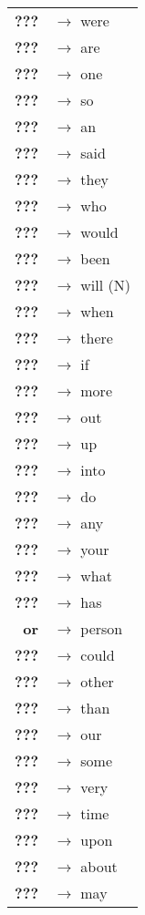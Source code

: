\begin{tabular}{rl}
\textbf{???} & $\rightarrow$ were \\
\textbf{???} & $\rightarrow$ are \\
\textbf{???} & $\rightarrow$ one \\
\textbf{???} & $\rightarrow$ so \\
\textbf{???} & $\rightarrow$ an \\
\textbf{???} & $\rightarrow$ said \\
\textbf{???} & $\rightarrow$ they \\
\textbf{???} & $\rightarrow$ who \\
\textbf{???} & $\rightarrow$ would \\
\textbf{???} & $\rightarrow$ been \\
\textbf{???} & $\rightarrow$ will (N) \\
\textbf{???} & $\rightarrow$ when \\
\textbf{???} & $\rightarrow$ there \\
\textbf{???} & $\rightarrow$ if \\
\textbf{???} & $\rightarrow$ more \\
\textbf{???} & $\rightarrow$ out \\
\textbf{???} & $\rightarrow$ up \\
\textbf{???} & $\rightarrow$ into \\
\textbf{???} & $\rightarrow$ do \\
\textbf{???} & $\rightarrow$ any \\
\textbf{???} & $\rightarrow$ your \\
\textbf{???} & $\rightarrow$ what \\
\textbf{???} & $\rightarrow$ has \\
\textbf{or} & $\rightarrow$ person \\
\textbf{???} & $\rightarrow$ could \\
\textbf{???} & $\rightarrow$ other \\
\textbf{???} & $\rightarrow$ than \\
\textbf{???} & $\rightarrow$ our \\
\textbf{???} & $\rightarrow$ some \\
\textbf{???} & $\rightarrow$ very \\
\textbf{???} & $\rightarrow$ time \\
\textbf{???} & $\rightarrow$ upon \\
\textbf{???} & $\rightarrow$ about \\
\textbf{???} & $\rightarrow$ may \\

\end{tabular}
